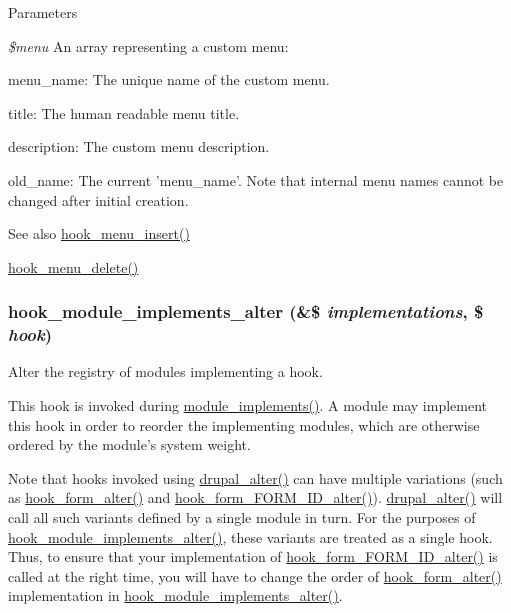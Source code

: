 \begin{DoxyParams}{Parameters}
\item[{\em \$menu}]An array representing a custom menu:
\begin{DoxyItemize}
\item menu\_\-name: The unique name of the custom menu.
\item title: The human readable menu title.
\item description: The custom menu description.
\item old\_\-name: The current 'menu\_\-name'. Note that internal menu names cannot be changed after initial creation.
\end{DoxyItemize}\end{DoxyParams}
\begin{DoxySeeAlso}{See also}
\hyperlink{group__hooks_ga8459a7c61564db3b5ccd53d39ada1555}{hook\_\-menu\_\-insert()} 

\hyperlink{group__hooks_gaef8c43d600c4efbae913dc3841a93199}{hook\_\-menu\_\-delete()} 
\end{DoxySeeAlso}
\hypertarget{group__hooks_gab71c322e6487a3b99bd04c5b9adb13f6}{
\subsubsection[{hook\_\-module\_\-implements\_\-alter}]{\setlength{\rightskip}{0pt plus 5cm}hook\_\-module\_\-implements\_\-alter (\&\$ {\em implementations}, \/  \$ {\em hook})}}
\label{group__hooks_gab71c322e6487a3b99bd04c5b9adb13f6}
Alter the registry of modules implementing a hook.

This hook is invoked during \hyperlink{group__hooks_ga9191200072f2a641829e9d3c2759561f}{module\_\-implements()}. A module may implement this hook in order to reorder the implementing modules, which are otherwise ordered by the module's system weight.

Note that hooks invoked using \hyperlink{module_8inc_a0a8742a524bbb674b6c6a26755765007}{drupal\_\-alter()} can have multiple variations (such as \hyperlink{group__hooks_ga6df3cea27ae1407aeef4eae5444cb213}{hook\_\-form\_\-alter()} and \hyperlink{group__hooks_ga8d4a4089551493d55911bd5c4f218264}{hook\_\-form\_\-FORM\_\-ID\_\-alter()}). \hyperlink{module_8inc_a0a8742a524bbb674b6c6a26755765007}{drupal\_\-alter()} will call all such variants defined by a single module in turn. For the purposes of \hyperlink{group__hooks_gab71c322e6487a3b99bd04c5b9adb13f6}{hook\_\-module\_\-implements\_\-alter()}, these variants are treated as a single hook. Thus, to ensure that your implementation of \hyperlink{group__hooks_ga8d4a4089551493d55911bd5c4f218264}{hook\_\-form\_\-FORM\_\-ID\_\-alter()} is called at the right time, you will have to change the order of \hyperlink{group__hooks_ga6df3cea27ae1407aeef4eae5444cb213}{hook\_\-form\_\-alter()} implementation in \hyperlink{group__hooks_gab71c322e6487a3b99bd04c5b9adb13f6}{hook\_\-module\_\-implements\_\-alter()}.


